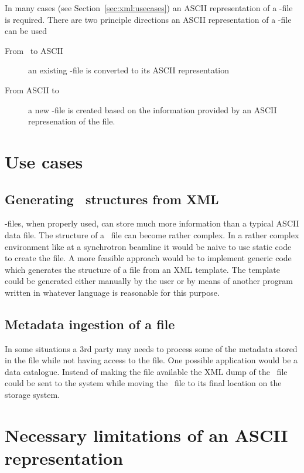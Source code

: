 
In many cases (see Section~\ref{sec:xml:usecases}) an ASCII representation of a
\nexus-file is required. There are two principle directions an ASCII
representation of a \nexus-file can be used
\begin{description}
    \item[From \nexus\ to ASCII]  an existing \nexus-file is converted to 
        its ASCII representation
    \item[From ASCII to \nexus] a new \nexus-file is created based on the 
        information provided by an ASCII represenation of the file.
\end{description}

\section{Use cases}\label{sec:ascii:usecases}

\subsection{Generating \nexus\ structures from XML}

\nexus-files, when properly used, can store much more information than a typical
ASCII data file.
The structure of a \nexus\ file can become rather complex. In a rather complex 
environment like at a synchrotron beamline it would be naive to use static 
code to create the file. A more feasible approach would be to implement 
generic code which generates the structure of a file from an XML template. 
The template could be generated either manually by the user or by means 
of another program written in whatever language is reasonable for this purpose. 

\subsection{Metadata ingestion of a file}

In some situations a $3$rd party may needs to process some of the metadata 
stored in the file while not having access to the file. One possible application
would be a data catalogue. Instead of making the file available the XML dump 
of the \nexus\ file could be sent to the system while moving the \nexus\ file 
to its final location on the storage system.

\section{Necessary limitations of an ASCII representation}
\label{sec:ascii:limitations}

